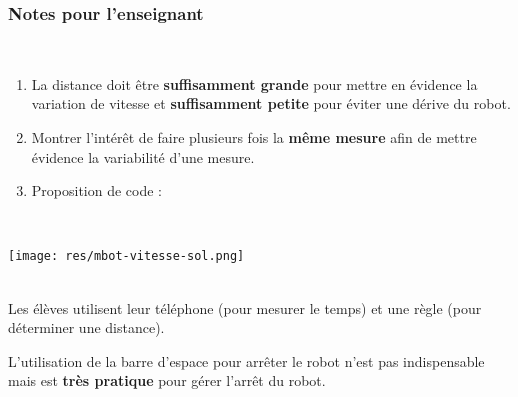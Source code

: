 \subsubsection{Notes pour l'enseignant}

%
%

\begin{minipage}[t]{0.5\linewidth}
    \begin{methode}~\\
     \begin{enumerate}
         \item La distance doit être \textbf{suffisamment grande} pour mettre en évidence la variation de vitesse et \textbf{suffisamment petite} pour éviter une dérive du robot.
        \item Montrer l'intérêt de faire plusieurs fois la \textbf{même mesure} afin de mettre évidence la variabilité d'une mesure.
        \item Proposition de code :
     \end{enumerate}
        ~\\
        \begin{center}
            \texttt{[image: res/mbot-vitesse-sol.png]}
        \end{center}
    \end{methode}
\end{minipage}
\hfill
\begin{minipage}[t]{0.5\linewidth}
    \begin{remarque}~\\
        Les élèves utilisent leur téléphone (pour mesurer le temps) et une règle (pour déterminer une distance).
        
        L'utilisation de la barre d'espace pour arrêter le robot n'est pas indispensable mais est \textbf{très pratique} pour gérer l'arrêt du robot.
    \end{remarque}
\end{minipage}